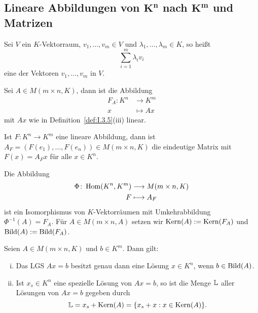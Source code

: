 \subsection{Lineare Abbildungen von $\mathbf{K^n}$ nach $\mathbf{K^m}$ und Matrizen}
\label{sec:I.6}

\begin{definition}[Linearkombination]
	\label{def:I.6.1}
	Sei $V$ ein $K$-Vektorraum, $v_1,\dots,v_m \in V$ und $\lambda_1,\dots,\lambda_m \in K$, so heißt
	\[
		\sum_{i=1}^{m} \lambda_i v_i
	\]
	eine  der Vektoren $v_1,\dots,v_m$ in $V$.
\end{definition}

\setcounter{satz}{2}
\begin{lemma}
	\label{lemma:I.6.3}
	Sei $A \in M(m \times n,K)$, dann ist die Abbildung
	\begin{align*}
		F_A \colon K^n &\longrightarrow K^m \\
		x &\longmapsto Ax
	\end{align*}
	mit $Ax$ wie in Definition~\ref{def:I.3.5}(iii) linear.
\end{lemma}

\begin{satz}
	\label{satz:I.6.4}
	Ist $F\colon K^n \rightarrow K^m$ eine lineare Abbildung, dann ist $A_F = (F(e_1),\dots,F(e_n)) \in M(m\times n,K)$ die eindeutige Matrix mit $F(x) = A_F x$ für alle $x \in K^n$.
\end{satz}

\setcounter{satz}{5}
\begin{satz}
	\label{satz:I.6.6}
	Die Abbildung
	\begin{align*}
		\Phi \colon \operatorname{Hom}(K^n,K^m) &\longrightarrow M(m \times n,K) \\
		F &\longmapsto A_F
	\end{align*}
	ist ein Isomorphismus von $K$-Vektorräumen mit Umkehrabbildung $\Phi^{-1}(A) = F_A$.
	Für $A \in M(m\times n,A)$ setzen wir $\operatorname{Kern}(A) := \operatorname{Kern}(F_A)$ und $\operatorname{Bild}(A) := \operatorname{Bild}(F_A)$.
\end{satz}

\setcounter{satz}{7}
\begin{satz}
	\label{satz:I.6.8}
	Seien $A \in M(m\times n,K)$ und $b \in K^m$.
	Dann gilt:
	\begin{enumerate}[(i)]
		\item Das LGS $Ax = b$ besitzt genau dann eine Lösung $x \in K^n$, wenn $b \in \operatorname{Bild}(A)$.
		\item Ist $x_s \in K^n$ eine spezielle Lösung von $Ax=b$, so ist die Menge $\mathbb{L}$ aller Lösungen von $Ax=b$ gegeben durch
		\[
			\mathbb{L} = x_s + \operatorname{Kern}(A) = \{x_s + x : x \in \operatorname{Kern}(A)\}.
		\]
	\end{enumerate}
\end{satz}

